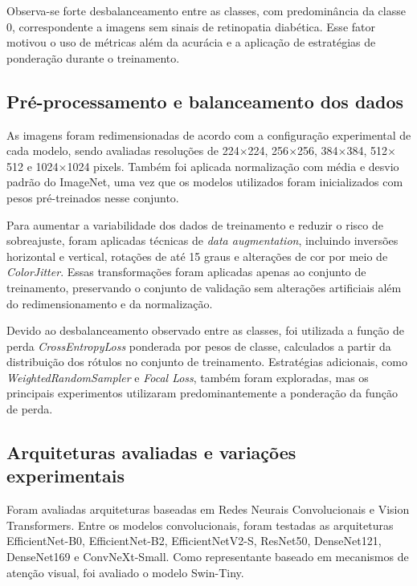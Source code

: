 \documentclass[conference]{IEEEtran}
\begin{document}
Observa-se forte desbalanceamento entre as classes, com predomin\^ancia
da classe 0, correspondente a imagens sem sinais de retinopatia diab\'etica.
Esse fator motivou o uso de m\'etricas al\'em da acur\'acia e a aplica\c{c}\~ao
de estrat\'egias de pondera\c{c}\~ao durante o treinamento.

\subsection{Pr\'e-processamento e balanceamento dos dados}

As imagens foram redimensionadas de acordo com a configura\c{c}\~ao
experimental de cada modelo, sendo avaliadas resolu\c{c}\~oes de
224$\times$224, 256$\times$256, 384$\times$384, 512$\times$512 e
1024$\times$1024 pixels. Tamb\'em foi aplicada normaliza\c{c}\~ao com
m\'edia e desvio padr\~ao do ImageNet, uma vez que os modelos utilizados
foram inicializados com pesos pr\'e-treinados nesse conjunto.

Para aumentar a variabilidade dos dados de treinamento e reduzir o risco
de sobreajuste, foram aplicadas t\'ecnicas de \textit{data augmentation},
incluindo invers\~oes horizontal e vertical, rota\c{c}\~oes de at\'e
15 graus e altera\c{c}\~oes de cor por meio de \textit{ColorJitter}.
Essas transforma\c{c}\~oes foram aplicadas apenas ao conjunto de
treinamento, preservando o conjunto de valida\c{c}\~ao sem altera\c{c}\~oes
artificiais al\'em do redimensionamento e da normaliza\c{c}\~ao.

Devido ao desbalanceamento observado entre as classes, foi utilizada a
fun\c{c}\~ao de perda \textit{CrossEntropyLoss} ponderada por pesos de
classe, calculados a partir da distribui\c{c}\~ao dos r\'otulos no
conjunto de treinamento. Estrat\'egias adicionais, como
\textit{WeightedRandomSampler} e \textit{Focal Loss}, tamb\'em foram
exploradas, mas os principais experimentos utilizaram predominantemente
a pondera\c{c}\~ao da fun\c{c}\~ao de perda.

\subsection{Arquiteturas avaliadas e varia\c{c}\~oes experimentais}

Foram avaliadas arquiteturas baseadas em Redes Neurais Convolucionais e
Vision Transformers. Entre os modelos convolucionais, foram testadas as
arquiteturas EfficientNet-B0, EfficientNet-B2, EfficientNetV2-S,
ResNet50, DenseNet121, DenseNet169 e ConvNeXt-Small. Como representante
baseado em mecanismos de aten\c{c}\~ao visual, foi avaliado o modelo
Swin-Tiny.
\end{document}
